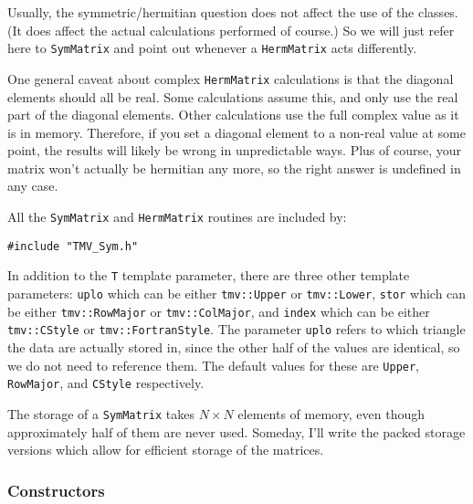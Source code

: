 \documentclass[twoside,letterpaper,11pt]{article}
\renewcommand{\tt}[1]{{\texttt {#1}}}
\begin{document}
Usually, the symmetric/hermitian question does not affect the use of the classes.
(It does affect the actual calculations performed of course.)  So we will just refer
here to \tt{SymMatrix} and point out whenever a \tt{HermMatrix} acts differently.

One general caveat about complex \tt{HermMatrix} calculations is that the diagonal
elements should all be real.  Some calculations assume this, and only 
use the real part of the diagonal elements.  Other calculations use the 
full complex value as it is in memory.  Therefore, if you set a diagonal element 
to a non-real value at some point, the results will likely be wrong in
unpredictable ways.  Plus of course, your matrix won't actually be hermitian any more,
so the right answer is undefined in any case.

All the \tt{SymMatrix} and \tt{HermMatrix} routines are included by:
\begin{verbatim}
#include "TMV_Sym.h"
\end{verbatim}

In addition to the \tt{T} template parameter, there are three other template 
parameters: \tt{uplo} which can be either \tt{tmv::Upper} or \tt{tmv::Lower},
\tt{stor} which can be either \tt{tmv::RowMajor} or \tt{tmv::ColMajor}, and
\tt{index} which can be either \tt{tmv::CStyle} or \tt{tmv::FortranStyle}.
The parameter \tt{uplo} refers to which triangle the data are actually stored in, 
since the
other half of the values are identical, so we do not need to reference them.
The default values for these are \tt{Upper}, \tt{RowMajor}, and \tt{CStyle}
respectively.

The storage of a \tt{SymMatrix} takes
$N \times N$ elements of memory, even though approximately half of them 
are never used.  Someday, I'll write the packed storage versions which allow for
efficient storage of the matrices.

\subsubsection{Constructors}
\end{document}
